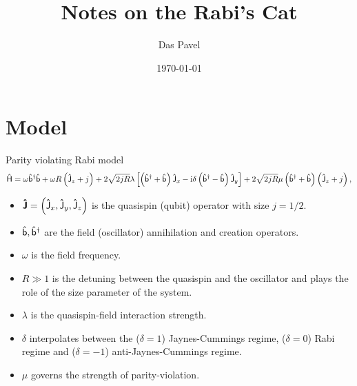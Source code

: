 \documentclass[a4paper,11pt,twoside]{article}
\begin{document}
\title{Notes on the Rabi's Cat}
\date{\today}
\author{Das Pavel}

\maketitle
\section{Model}
	Parity violating Rabi model
	\begin{equation}
		\label{eq:H}
		\mathsf{\hat{H}}=
			\omega{\mathsf{\hat{b}}}^{\dagger}\mathsf{\hat{b}}+\omega R\left(\mathsf{\hat{J}}_{z}+j\right)
			+2\sqrt{2jR}\lambda\left[\left({\mathsf{\hat{b}}}^{\dagger}+\mathsf{\hat{b}}\right)\mathsf{\hat{J}}_{x}-\mathrm{i}\delta\left({\mathsf{\hat{b}}}^{\dagger}-\mathsf{\hat{b}}\right)\mathsf{\hat{J}}_{y}\right]
			+2\sqrt{2jR}\mu\left({\mathsf{\hat{b}}}^{\dagger}+\mathsf{\hat{b}}\right)\left(\mathsf{\hat{J}}_{z}+j\right),
	\end{equation}
	\begin{itemize}
		\item
			$\boldsymbol{\mathsf{\hat{J}}}=\left(\mathsf{\hat{J}}_{x},\mathsf{\hat{J}}_{y},\mathsf{\hat{J}}_{z}\right)$ is the quasispin (qubit) operator with size $j=1/2$.

		\item 
			$\mathsf{\hat{b}},{\mathsf{\hat{b}}}^{\dagger}$ are the field (oscillator) annihilation and creation operators.

		\item 
			$\omega$ is the field frequency.

		\item
			$R\gg1$ is the detuning between the quasispin and the oscillator and plays the role of the size parameter of the system.

		\item 
			$\lambda$ is the quasispin-field interaction strength. 

		\item
			$\delta$ interpolates between the ($\delta=1$) Jaynes-Cummings regime, ($\delta=0$) Rabi regime and ($\delta=-1$) anti-Jaynes-Cummings regime.

		\item
			$\mu$ governs the strength of parity-violation.
	\end{itemize}
\end{document}
